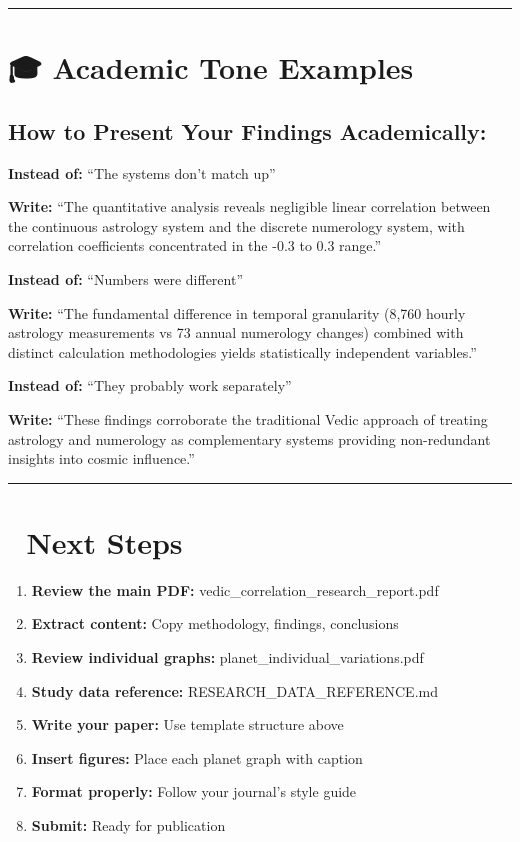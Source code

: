 \documentclass[
  11pt,
  oneside,
  openany]{scrbook}
\providecommand{\tightlist}{%
  \setlength{\itemsep}{0pt}\setlength{\parskip}{0pt}}\usepackage{longtable,booktabs,array}
\begin{document}
\begin{center}\rule{0.5\linewidth}{0.5pt}\end{center}

\section{🎓 Academic Tone Examples}\label{academic-tone-examples}

\subsection{How to Present Your Findings
Academically:}\label{how-to-present-your-findings-academically}

\textbf{Instead of:} ``The systems don't match up''

\textbf{Write:} ``The quantitative analysis reveals negligible linear
correlation between the continuous astrology system and the discrete
numerology system, with correlation coefficients concentrated in the
-0.3 to 0.3 range.''

\textbf{Instead of:} ``Numbers were different''

\textbf{Write:} ``The fundamental difference in temporal granularity
(8,760 hourly astrology measurements vs 73 annual numerology changes)
combined with distinct calculation methodologies yields statistically
independent variables.''

\textbf{Instead of:} ``They probably work separately''

\textbf{Write:} ``These findings corroborate the traditional Vedic
approach of treating astrology and numerology as complementary systems
providing non-redundant insights into cosmic influence.''

\begin{center}\rule{0.5\linewidth}{0.5pt}\end{center}

\section{🚀 Next Steps}\label{next-steps}

\begin{enumerate}
\def\labelenumi{\arabic{enumi}.}
\tightlist
\item
  \textbf{Review the main PDF:} vedic\_correlation\_research\_report.pdf
\item
  \textbf{Extract content:} Copy methodology, findings, conclusions
\item
  \textbf{Review individual graphs:} planet\_individual\_variations.pdf
\item
  \textbf{Study data reference:} RESEARCH\_DATA\_REFERENCE.md
\item
  \textbf{Write your paper:} Use template structure above
\item
  \textbf{Insert figures:} Place each planet graph with caption
\item
  \textbf{Format properly:} Follow your journal's style guide
\item
  \textbf{Submit:} Ready for publication
\end{enumerate}
\end{document}
